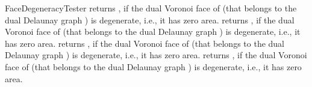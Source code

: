 \begin{ccRefFunctionObjectConcept}{FaceDegeneracyTester}
\ccThreeToTwo
{}
{returns , if the dual Voronoi face of  (that
  belongs to the dual Delaunay graph ) is
  degenerate, i.e., it has zero area.}
%
\ccGlue
{}
{returns , if the dual Voronoi face of  (that
  belongs to the dual Delaunay graph ) is
  degenerate, i.e., it has zero area.}
%
\ccGlue
{}
{returns , if the dual Voronoi face of  (that
  belongs to the dual Delaunay graph ) is
  degenerate, i.e., it has zero area.}
%
\ccGlue
{}
{returns , if the dual Voronoi face of  (that
  belongs to the dual Delaunay graph ) is
  degenerate, i.e., it has zero area.}


\ccSeeAlso
{}

\end{ccRefFunctionObjectConcept}
